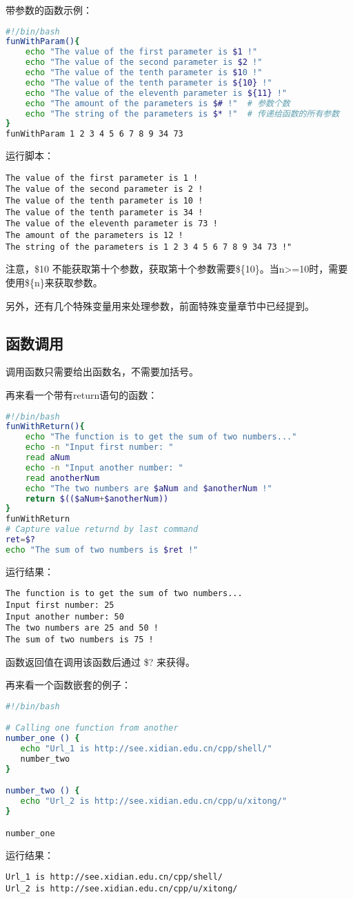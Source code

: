带参数的函数示例：
\begin{lstlisting}[language=sh]
#!/bin/bash
funWithParam(){
    echo "The value of the first parameter is $1 !"
    echo "The value of the second parameter is $2 !"
    echo "The value of the tenth parameter is $10 !"
    echo "The value of the tenth parameter is ${10} !"
    echo "The value of the eleventh parameter is ${11} !"
    echo "The amount of the parameters is $# !"  # 参数个数
    echo "The string of the parameters is $* !"  # 传递给函数的所有参数
}
funWithParam 1 2 3 4 5 6 7 8 9 34 73
\end{lstlisting}
运行脚本：
\begin{verbatim}
The value of the first parameter is 1 !
The value of the second parameter is 2 !
The value of the tenth parameter is 10 !
The value of the tenth parameter is 34 !
The value of the eleventh parameter is 73 !
The amount of the parameters is 12 !
The string of the parameters is 1 2 3 4 5 6 7 8 9 34 73 !"
\end{verbatim}

注意，\$10 不能获取第十个参数，获取第十个参数需要\$\{10\}。当n>=10时，需要使用\$\{n\}来获取参数。

另外，还有几个特殊变量用来处理参数，前面特殊变量章节中已经提到。


\subsection{函数调用}
调用函数只需要给出函数名，不需要加括号。

再来看一个带有return语句的函数：
\begin{lstlisting}[language=sh]
#!/bin/bash
funWithReturn(){
    echo "The function is to get the sum of two numbers..."
    echo -n "Input first number: "
    read aNum
    echo -n "Input another number: "
    read anotherNum
    echo "The two numbers are $aNum and $anotherNum !"
    return $(($aNum+$anotherNum))
}
funWithReturn
# Capture value returnd by last command
ret=$?
echo "The sum of two numbers is $ret !"
\end{lstlisting}
运行结果：
\begin{verbatim}
The function is to get the sum of two numbers...
Input first number: 25
Input another number: 50
The two numbers are 25 and 50 !
The sum of two numbers is 75 !
\end{verbatim}
函数返回值在调用该函数后通过 \$? 来获得。

再来看一个函数嵌套的例子：
\begin{lstlisting}[language=sh]
#!/bin/bash

# Calling one function from another
number_one () {
   echo "Url_1 is http://see.xidian.edu.cn/cpp/shell/"
   number_two
}

number_two () {
   echo "Url_2 is http://see.xidian.edu.cn/cpp/u/xitong/"
}

number_one
\end{lstlisting}
运行结果：
\begin{verbatim}
Url_1 is http://see.xidian.edu.cn/cpp/shell/
Url_2 is http://see.xidian.edu.cn/cpp/u/xitong/
\end{verbatim}



